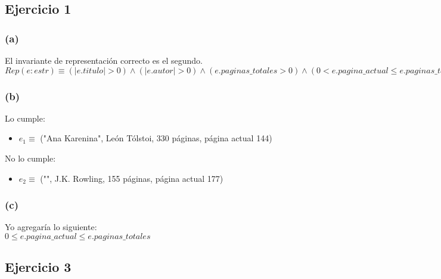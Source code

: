 \documentclass[12 pt]{article}
\begin{document}
\subsection*{Ejercicio 1}
    \subsubsection*{(a)}
        El invariante de representación correcto es el segundo.
        \\
        $Rep(e:estr) \equiv (|e.titulo| > 0) \wedge (|e.autor| > 0) \wedge (e.paginas\_totales > 0) \wedge (0 < e.pagina\_actual \leq e.paginas\_totales)$
    \subsubsection*{(b)}
        Lo cumple:
        \begin{itemize}
            \item $e_{1} \equiv $ ("Ana Karenina", León Tólstoi, 330 páginas, página actual 144)
        \end{itemize}
        No lo cumple:
        \begin{itemize}
            \item $e_{2} \equiv $ ("", J.K. Rowling, 155 páginas, página actual 177)
        \end{itemize}
    \subsubsection*{(c)}
        Yo agregaría lo siguiente:
        \\
        $0 \leq e.pagina\_actual \leq e.paginas\_totales$

\subsection*{Ejercicio 3}
\end{document}

